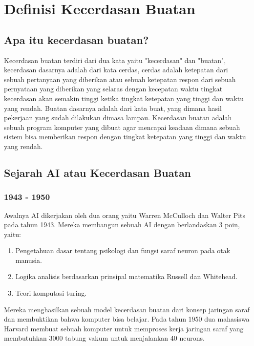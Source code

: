 \chapter{Definisi Kecerdasan Buatan}

\section{Apa itu kecerdasan buatan?}
\par Kecerdasan buatan terdiri dari dua kata yaitu "kecerdasan" dan "buatan", kecerdasan dasarnya adalah dari kata cerdas, cerdas adalah ketepatan dari sebuah pertanyaan yang diberikan atau sebuah ketepatan respon dari sebuah pernyataan yang diberikan yang selaras dengan kecepatan waktu tingkat kecerdasan akan semakin tinggi ketika tingkat ketepatan yang tinggi dan waktu yang rendah. Buatan dasarnya adalah dari kata buat, yang dimana hasil pekerjaan yang sudah dilakukan dimasa lampau. Kecerdasan buatan adalah sebuah program komputer yang dibuat agar mencapai keadaan dimana sebuah sistem bisa memberikan respon dengan tingkat ketepatan yang tinggi dan waktu yang rendah.

\section{Sejarah AI atau Kecerdasan Buatan}

\subsection{1943 - 1950}
\par Awalnya AI dikerjakan oleh dua orang yaitu Warren McCulloch dan Walter Pits pada tahun 1943. Mereka membangun sebuah AI dengan berlandaskan 3 poin, yaitu:
\begin{enumerate}
    \item Pengetahuan dasar tentang psikologi dan fungsi saraf neuron pada otak manusia.
    \item Logika analisis berdasarkan prinsipal matematika Russell dan Whitehead.
    \item Teori komputasi turing.
\end{enumerate}
\par Mereka menghasilkan sebuah model kecerdasan buatan dari konsep jaringan saraf dan membuktikan bahwa komputer bisa belajar. Pada tahun 1950 dua mahasiswa Harvard membuat sebuah komputer untuk memproses kerja jaringan saraf yang membutuhkan 3000 tabung vakum untuk menjalankan 40 neurons.

